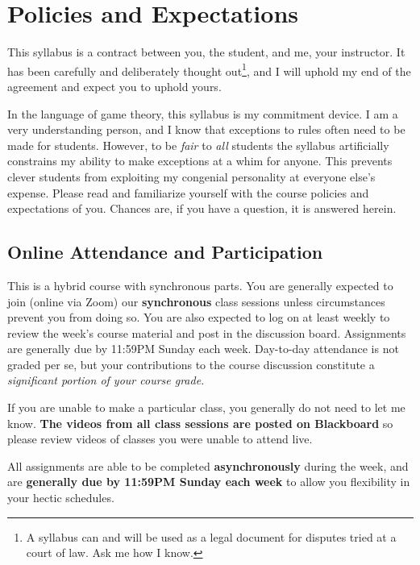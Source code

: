 \documentclass{article}
\begin{document}
\hypertarget{policies-and-expectations}{%
\section*{Policies and Expectations}\label{policies-and-expectations}}

This syllabus is a contract between you, the student, and me, your
instructor. It has been carefully and deliberately thought out\footnote{A
  syllabus can and will be used as a legal document for disputes tried
  at a court of law. Ask me how I know.}, and I will uphold my end of
the agreement and expect you to uphold yours.

In the language of game theory, this syllabus is my commitment device. I
am a very understanding person, and I know that exceptions to rules
often need to be made for students. However, to be \emph{fair} to
\emph{all} students the syllabus artificially constrains my ability to
make exceptions at a whim for anyone. This prevents clever students from
exploiting my congenial personality at everyone else's expense. Please
read and familiarize yourself with the course policies and expectations
of you. Chances are, if you have a question, it is answered herein.

\hypertarget{online-attendance-and-participation}{%
\subsection*{Online Attendance and
Participation}\label{online-attendance-and-participation}}

This is a hybrid course with synchronous parts. You are generally
expected to join (online via Zoom) our \textbf{synchronous} class
sessions unless circumstances prevent you from doing so. You are also
expected to log on at least weekly to review the week's course material
and post in the discussion board. Assignments are generally due by
11:59PM Sunday each week. Day-to-day attendance is not graded per se,
but your contributions to the course discussion constitute a
\emph{significant portion of your course grade.}

If you are unable to make a particular class, you generally do not need
to let me know. \textbf{The videos from all class sessions are posted on
Blackboard} so please review videos of classes you were unable to attend
live.

All assignments are able to be completed \textbf{asynchronously} during
the week, and are \textbf{generally due by 11:59PM Sunday each week} to
allow you flexibility in your hectic schedules.
\end{document}
